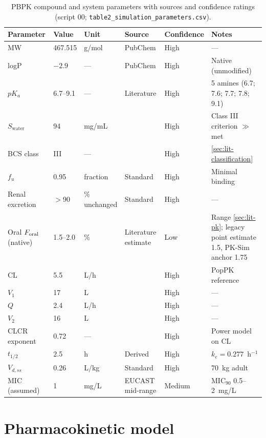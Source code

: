 \begin{table}[htbp]
\centering
\caption{PBPK compound and system parameters with sources and confidence ratings (script 00; \texttt{table2\_simulation\_parameters.csv}).}
\label{tab:compound-params}
\footnotesize\setlength{\tabcolsep}{3.5pt}
\begin{tabular}{llllp{1.4cm}p{2.6cm}}
\toprule
Parameter & Value & Unit & Source & Confidence & Notes\\
\midrule
MW & 467.515 & g/mol & PubChem \citep{PubChem2026} & High & ---\\
logP & $-2.9$ & --- & PubChem & High & Native (unmodified)\\
$pK_a$ & 6.7--9.1 & --- & Literature & High & 5 amines (6.7; 7.6; 7.7; 7.8; 9.1)\\
$S_{\mathrm{water}}$ & 94 & mg/mL & \citet{Chen2009} & High & Class III criterion $\gg$ met\\
BCS class & III & --- & \citet{Asad2023} & High & \cref{sec:lit-classification}\\
$f_u$ & 0.95 & fraction & Standard & High & Minimal binding\\
Renal excretion & $>$90 & \% unchanged & Standard & High & ---\\
Oral $F_{\mathrm{oral}}$ (native) & 1.5--2.0 & \% & Literature estimate & Low & Range \cref{sec:lit-pk}; legacy point estimate 1.5, PK-Sim anchor 1.75 \\
\midrule
CL & 5.5 & L/h & \citet{Li2021} & High & PopPK reference\\
$V_1$ & 17 & L & \citet{Li2021} & High & ---\\
$Q$ & 2.4 & L/h & \citet{Li2021} & High & ---\\
$V_2$ & 16 & L & \citet{Li2021} & High & ---\\
CLCR exponent & 0.72 & --- & \citet{Li2021} & High & Power model on CL\\
$t_{1/2}$ & 2.5 & h & Derived & High & $k_e=0.277$~h$^{-1}$\\
$V_{d,ss}$ & 0.26 & L/kg & Standard & High & 70~kg adult\\
MIC (assumed) & 1 & mg/L & EUCAST mid-range & Medium & $\mathrm{MIC}_{90}$ 0.5--2~mg/L\\
\bottomrule
\end{tabular}
\end{table}

\section{Pharmacokinetic model}
\label{sec:pk-model}

